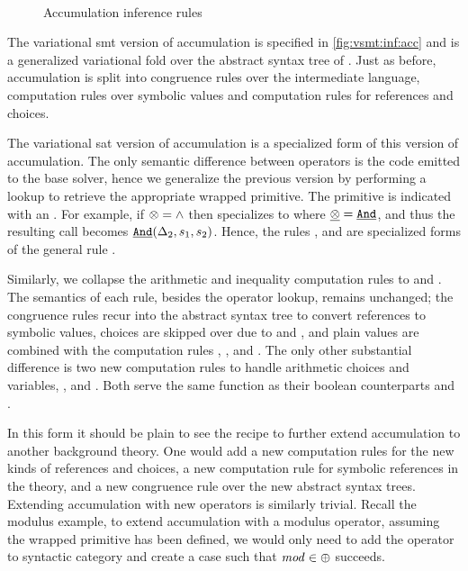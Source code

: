 ~\label{section:vsmt:accumulation}
%
\begin{figure}
  
  \caption{Accumulation inference rules}%
  \label{fig:vsmt:inf:acc}
\end{figure}
%
%
The variational \ac{smt} version of accumulation is specified in
\autoref{fig:vsmt:inf:acc} and is a generalized variational fold over the
abstract syntax tree of \eIL{}. Just as before, accumulation is split into
congruence rules over the intermediate language, computation rules over symbolic
values and computation rules for references and choices.

The variational \ac{sat} version of accumulation is a specialized form of this
version of accumulation. The only semantic difference between operators is the
code emitted to the base solver, hence we generalize the previous version by
performing a lookup to retrieve the appropriate wrapped primitive. The primitive
is indicated with an . For example, if $\otimes{}{} = \wedge$
then \acBoolS{} specializes to \acAndS{} where $\underline{\otimes{}{}} =
\underline{\texttt{And}}$, and thus the resulting call becomes $\underline{\texttt{And}}(\Delta_{2},
s_1, s_2)$. Hence, the rules \acAndS{}, and \acOrS{} are specialized forms of
the general rule \acBoolS.

Similarly, we collapse the arithmetic and inequality computation rules to
\acArithS{} and \acInEqS{}. The semantics of each rule, besides the operator
lookup, remains unchanged; the congruence rules recur into the abstract syntax
tree to convert references to symbolic values, choices are skipped over due to
\acChc{} and \acChcI{}, and plain values are combined with the computation rules
\acBoolS, \acArithS, and \acInEqS.
%
The only other substantial difference is two new computation rules to handle
arithmetic choices and variables, \acChcI{}, and \acRefI{}. Both serve the same
function as their boolean counterparts \acChc{} and \acRef{}.

In this form it should be plain to see the recipe to further extend accumulation
to another background theory. One would add a new computation rules for the new
kinds of references and choices, a new computation rule for symbolic references
in the theory, and a new congruence rule over the new abstract syntax trees.
Extending accumulation with new operators is similarly trivial. Recall the
modulus example, to extend accumulation with a modulus operator, assuming the
wrapped primitive has been defined, we would only need to add the operator to
\integerFuncs{} syntactic category and create a case such that $\mathit{mod} \in
\oplus{}{}$ succeeds.




